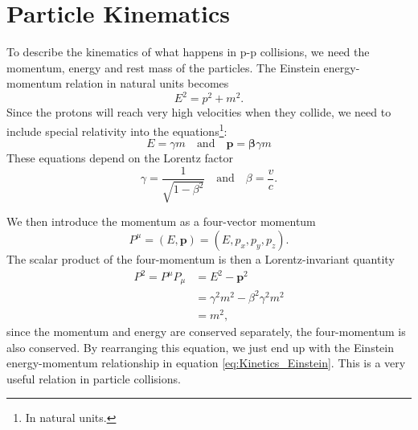 \documentclass[a4paper, american, 12pt]{report}
\begin{document}
	\section{Particle Kinematics}
	\label{sect:Theory-Part_kinematics}
	To describe the kinematics of what happens in p-p collisions, we need the momentum, energy and rest mass of the particles. The Einstein energy-momentum relation in natural units becomes 
	\begin{equation}
	\label{eq:Kinetics_Einstein}
		E^2=p^2+m^2.
	\end{equation}
	Since the protons will reach very high velocities when they collide, we need to include special relativity into the equations\footnote{In natural units.}:
	\begin{equation}
	\label{eq:Kinematics}
		E=\gamma m \quad \text{and}\quad \textbf{p}=\boldsymbol{\beta}\gamma m
	\end{equation}
	These equations depend on the Lorentz factor
	\begin{equation*}
	\label{eq:Lorentz_factor}
		\gamma=\frac{1}{\sqrt{1-\beta^2}}\quad \text{and} \quad \beta=\frac{v}{c}.
	\end{equation*}

	We then introduce the momentum as a four-vector momentum \[P^{\mu}=(E,\textbf{p})=(E,p_x,p_y,p_z).\] The scalar product of the four-momentum is then a Lorentz-invariant quantity
	\begin{align}
	\label{eq:Four-momenta}
		P^2=P^{\mu}P_{\mu}&=E^2-\textbf{p}^2\\
		&=\gamma^2m^2-\beta^2\gamma^2m^2 \nonumber\\
		&=m^2,\nonumber
	\end{align} 
	since the momentum and energy are conserved separately, the four-momentum is also conserved. By rearranging this equation, we just end up with the Einstein energy-momentum relationship in equation \ref{eq:Kinetics_Einstein}. This is a very useful relation in particle collisions.
	
\end{document}
